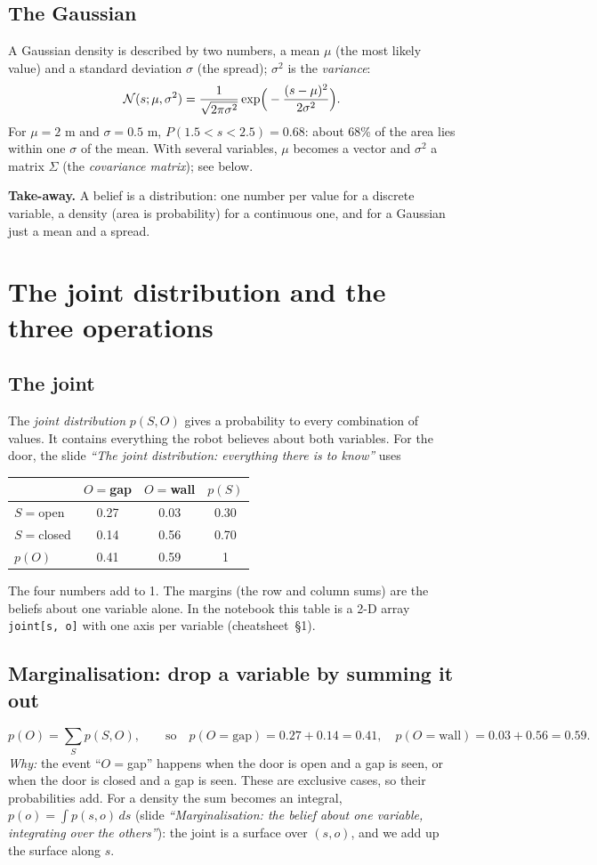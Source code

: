 \documentclass[11pt]{article}
\newcommand{\slide}[1]{\textit{``#1''}}
\newcommand{\cs}[1]{cheatsheet~\S#1}
\begin{document}
\subsection*{The Gaussian}
A Gaussian density is described by two numbers, a mean $\mu$ (the most likely value) and a standard deviation $\sigma$ (the spread); $\sigma^2$ is the \emph{variance}:
\[
\mathcal{N}(s;\mu,\sigma^2)=\frac{1}{\sqrt{2\pi\sigma^2}}\exp\!\Big(-\frac{(s-\mu)^2}{2\sigma^2}\Big).
\]
For $\mu=2$ m and $\sigma=0.5$ m, $P(1.5<s<2.5)=0.68$: about 68\% of the area lies within one $\sigma$ of the mean. With several variables, $\mu$ becomes a vector and $\sigma^2$ a matrix $\Sigma$
(the \emph{covariance matrix}); see below.

\begin{keyidea}
\textbf{Take-away.} A belief is a distribution: one number per value for a discrete variable, a density (area is probability) for a continuous one, and for a Gaussian just a mean and a spread.
\end{keyidea}

\section{The joint distribution and the three operations}

\subsection*{The joint}
The \emph{joint distribution} $p(S,O)$ gives a probability to every combination of values. It contains everything the robot believes about both variables.
For the door, the slide \slide{The joint distribution: everything there is to know} uses
\begin{center}
\begin{tabular}{l|cc|c}
& $O=$gap & $O=$wall & $p(S)$\\\hline
$S=$open & 0.27 & 0.03 & 0.30\\
$S=$closed & 0.14 & 0.56 & 0.70\\\hline
$p(O)$ & 0.41 & 0.59 & 1
\end{tabular}
\end{center}
The four numbers add to 1. The margins (the row and column sums) are the beliefs about one variable alone.
In the notebook this table is a 2-D array \texttt{joint[s, o]} with one axis per variable (\cs{1}).

\subsection*{Marginalisation: drop a variable by summing it out}
\[
p(O)=\sum_{S}p(S,O),\qquad\text{so}\quad p(O{=}\text{gap})=0.27+0.14=0.41,\quad p(O{=}\text{wall})=0.03+0.56=0.59 .
\]
\emph{Why:} the event ``$O=$gap'' happens when the door is open and a gap is seen, or when the door is closed and a gap is seen. These are exclusive cases, so their probabilities add.
For a density the sum becomes an integral, $p(o)=\int p(s,o)\,ds$ (slide \slide{Marginalisation: the belief about one variable, integrating over the others}): the joint is a surface over $(s,o)$, and we add up the surface along $s$.
\end{document}
